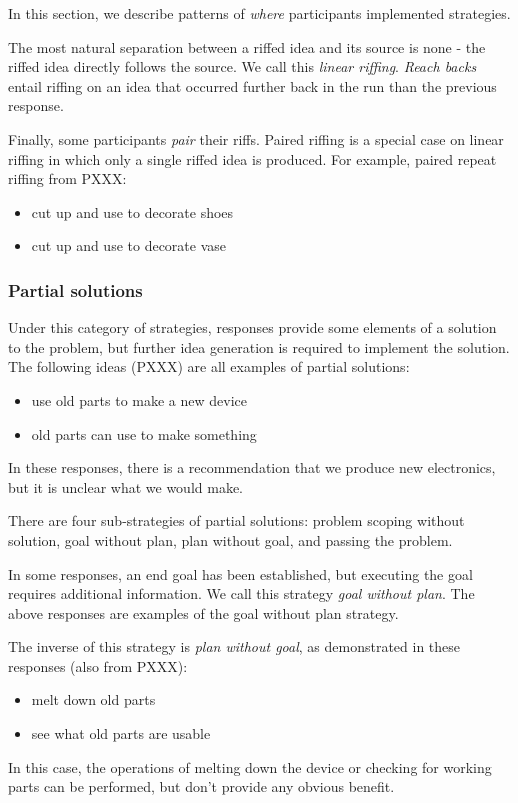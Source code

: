 In this section, we describe patterns of \emph{where} participants implemented strategies.

The most natural separation between a riffed idea and its source is none - the riffed idea directly follows the source. We call this \emph{linear riffing}.
\emph{Reach backs} entail riffing on an idea that occurred further back in the run than the previous response. 

Finally, some participants \emph{pair} their riffs. Paired riffing is a special case on linear riffing in which only a single riffed idea is produced. For example, paired repeat riffing from PXXX:

\begin{itemize}
\item cut up and use to decorate shoes
\item cut up and use to decorate vase
\end{itemize}


\subsubsection{Partial solutions}

Under this category of strategies, responses provide some elements of a solution to the problem, but further idea generation is required to implement the solution. The following ideas (PXXX) are all examples of partial solutions:

\begin{itemize}
    \item use old parts to make a new device
    \item old parts can use to make something
\end{itemize}

In these responses, there is a recommendation that we produce new electronics, but it is unclear what we would make. 

There are four sub-strategies of partial solutions: problem scoping without solution, goal without plan, plan without goal, and passing the problem. 

In some responses, an end goal has been established, but executing the goal requires additional information. We call this strategy \emph{goal without plan}. The above responses are examples of the goal without plan strategy.

The inverse of this strategy is \emph{plan without goal}, as demonstrated in these responses (also from PXXX):
\begin{itemize}
    \item melt down old parts
    \item see what old parts are usable
\end{itemize}
In this case, the operations of melting down the device or checking for working parts can be performed, but don't provide any obvious benefit.

